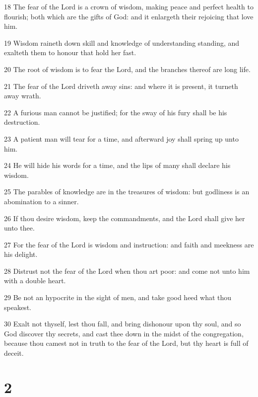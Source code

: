 \par 18 The fear of the Lord is a crown of wisdom, making peace and perfect health to flourish; both which are the gifts of God: and it enlargeth their rejoicing that love him.
\par 19 Wisdom raineth down skill and knowledge of understanding standing, and exalteth them to honour that hold her fast.
\par 20 The root of wisdom is to fear the Lord, and the branches thereof are long life.
\par 21 The fear of the Lord driveth away sins: and where it is present, it turneth away wrath.
\par 22 A furious man cannot be justified; for the sway of his fury shall be his destruction.
\par 23 A patient man will tear for a time, and afterward joy shall spring up unto him.
\par 24 He will hide his words for a time, and the lips of many shall declare his wisdom.
\par 25 The parables of knowledge are in the treasures of wisdom: but godliness is an abomination to a sinner.
\par 26 If thou desire wisdom, keep the commandments, and the Lord shall give her unto thee.
\par 27 For the fear of the Lord is wisdom and instruction: and faith and meekness are his delight.
\par 28 Distrust not the fear of the Lord when thou art poor: and come not unto him with a double heart.
\par 29 Be not an hypocrite in the sight of men, and take good heed what thou speakest.
\par 30 Exalt not thyself, lest thou fall, and bring dishonour upon thy soul, and so God discover thy secrets, and cast thee down in the midst of the congregation, because thou camest not in truth to the fear of the Lord, but thy heart is full of deceit.

\chapter{2}

